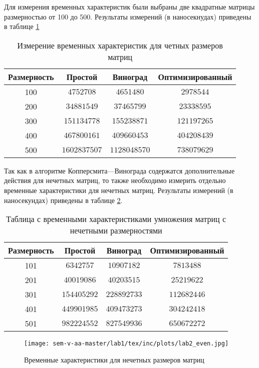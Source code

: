 Для измерения временных характеристик были выбраны две квадратные матрицы размерностью от 100  до 500. Результаты измерений (в наносекнудах) приведены в  таблице \ref{tab:benchmark_even}

\begin{table}[ht]
  \caption{Измерение временных характеристик для четных размеров матриц}
  \begin{tabular}{|c|c|c|c|}
  \hline
  Размерность & Простой & Виноград  & Оптимизированный\\
  \hline
  100  & $4752708$ &$4651480$ &$2978544$ \\
    \hline
  200  & $34881549$ &$37465799$ &$23338595$ \\
    \hline
  300  & $151134778$ &$155238871$ &$121197265$ \\
    \hline
  400  & $467800161$ &$409660453$ &$404208439$ \\
    \hline
  500  &  $1602837507$ &$1128048570$ &$738079629$ \\
  \hline
  \end{tabular}
  \label{tab:benchmark_even}
\end{table}

Так как в алгоритме Копперсмита---Винограда содержатся дополнительные действия для нечетных матриц, то также необходимо измерить отдельно временные характеристики для нечетных матриц. Результаты измерений (в наносекундах) приведены в таблице \ref{tab:benchmark_odd}. 

\begin{table}[ht]
  \caption{Таблица с временными характеристиками умножения матриц с нечетными размерностями}
  \begin{tabular}{|c|c|c|c|}
  \hline
  Размерность & Простой & Виноград  & Оптимизированный \\
  \hline
  101  & $6342757$ &$10907182$ &$7813488$ \\
    \hline
  201  & $40019086$ &$40203515$ &$25219622$ \\
    \hline
  301  & $154405292$ &$228892733$ &$112682446$ \\
    \hline
  401  & $449901985$ &$409473273$ &$304242418$ \\
    \hline
  501  &  $982224552$ &$827549936$ &$650672272$ \\
  \hline
  \end{tabular}
  \label{tab:benchmark_odd}
\end{table}


\begin{figure}
    \centering
    \texttt{[image: sem-v-aa-master/lab1/tex/inc/plots/lab2\_even.jpg]}
    \caption{Временные характеристики для нечетных размеров матриц}
    \label{fig:even}
\end{figure}


